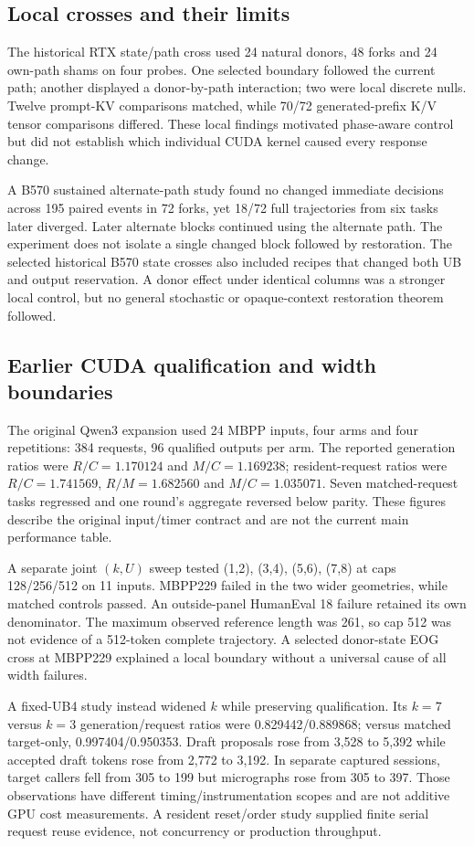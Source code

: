 \subsection{Local crosses and their limits}
The historical RTX state/path cross used 24 natural donors, 48 forks and 24 own-path shams on four probes. One selected boundary followed the current path; another displayed a donor-by-path interaction; two were local discrete nulls. Twelve prompt-KV comparisons matched, while 70/72 generated-prefix K/V tensor comparisons differed. These local findings motivated phase-aware control but did not establish which individual CUDA kernel caused every response change.

A B570 sustained alternate-path study found no changed immediate decisions across 195 paired events in 72 forks, yet 18/72 full trajectories from six tasks later diverged. Later alternate blocks continued using the alternate path. The experiment does not isolate a single changed block followed by restoration. The selected historical B570 state crosses also included recipes that changed both UB and output reservation. A donor effect under identical columns was a stronger local control, but no general stochastic or opaque-context restoration theorem followed.

\subsection{Earlier CUDA qualification and width boundaries}
The original Qwen3 expansion used 24 MBPP inputs, four arms and four repetitions: 384 requests, 96 qualified outputs per arm. The reported generation ratios were $R/C=1.170124$ and $M/C=1.169238$; resident-request ratios were $R/C=1.741569$, $R/M=1.682560$ and $M/C=1.035071$. Seven matched-request tasks regressed and one round's aggregate reversed below parity. These figures describe the original input/timer contract and are not the current main performance table.

A separate joint $(k,U)$ sweep tested (1,2), (3,4), (5,6), (7,8) at caps 128/256/512 on 11 inputs. MBPP229 failed in the two wider geometries, while matched controls passed. An outside-panel HumanEval 18 failure retained its own denominator. The maximum observed reference length was 261, so cap 512 was not evidence of a 512-token complete trajectory. A selected donor-state EOG cross at MBPP229 explained a local boundary without a universal cause of all width failures.

A fixed-UB4 study instead widened $k$ while preserving qualification. Its $k=7$ versus $k=3$ generation/request ratios were 0.829442/0.889868; versus matched target-only, 0.997404/0.950353. Draft proposals rose from 3,528 to 5,392 while accepted draft tokens rose from 2,772 to 3,192. In separate captured sessions, target callers fell from 305 to 199 but micrographs rose from 305 to 397. Those observations have different timing/instrumentation scopes and are not additive GPU cost measurements. A resident reset/order study supplied finite serial request reuse evidence, not concurrency or production throughput.

